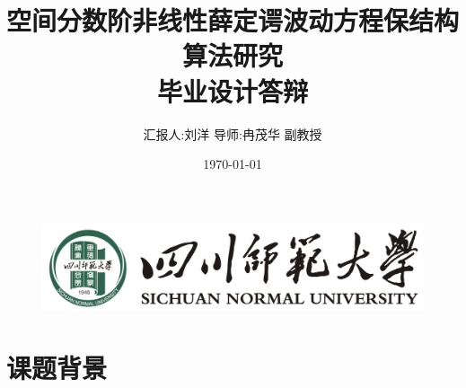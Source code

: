 \documentclass[aspectratio=169]{beamer}
\title[空间分数阶非线性薛定谔波动方程保结构算法研究
]{\small 空间分数阶非线性薛定谔波动方程保结构算法研究\\[2mm] 毕业设计答辩}
\author[刘洋]{\footnotesize 汇报人:刘洋 \quad 导师:冉茂华 副教授}
\institute[四川师范大学偏微分方程与物理团队]{\footnotesize 四川师范大学偏微分方程与物理团队}
\date{\footnotesize \vskip -10pt \today}
\begin{document}
\kaishu
\begin{frame}
	\titlepage
	\vspace{-2mm}
	\begin{figure}[htpb]
		\begin{center}
			\includegraphics[width=0.45\linewidth]{pic/SICNU_Logo2.png}
		\end{center}
	\end{figure}
\end{frame}
\begin{frame}
\tableofcontents[sectionstyle=show,subsectionstyle=show/shaded/hide,subsubsectionstyle=show/shaded/hide]
\end{frame}

\section{课题背景}

\end{document}
